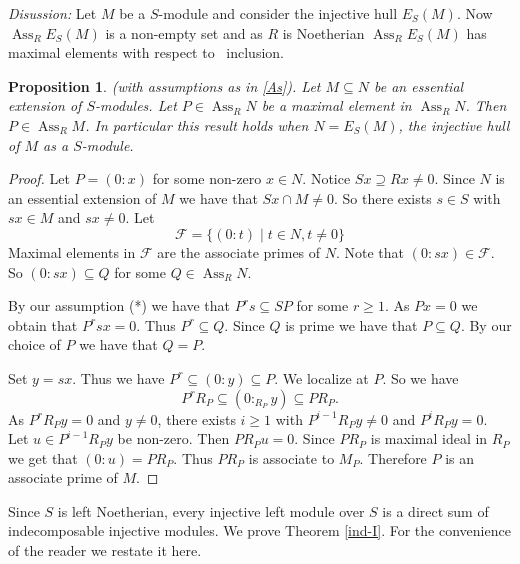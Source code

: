 \documentclass{amsart}
\theoremstyle{plain}
\newtheorem{proposition}[theorem]{Proposition}
\theoremstyle{definition}
\theoremstyle{remark}
\numberwithin{equation}{theorem}
\begin{document}
\s \emph{Disussion:} Let $M$ be a $S$-module and consider the injective hull $E_S(M)$. Now ${\operatorname{Ass}}_R E_S(M)$ is a non-empty set and as $R$ is Noetherian ${\operatorname{Ass}}_R E_S(M)$ has maximal elements {with respect to} \ inclusion.

\begin{proposition}\label{maxA}
(with assumptions as in \ref{As}). Let $M \subseteq N$ be an essential extension of $S$-modules. Let $P \in {\operatorname{Ass}}_R N$ be a maximal element in ${\operatorname{Ass}}_R N$. Then $P \in {\operatorname{Ass}}_R M$. In particular this result holds when $N = E_S(M)$, the injective hull of $M$ as a $S$-module.
\end{proposition}
\begin{proof}
Let $P = (0 \colon x)$ for some non-zero $x \in N$. Notice $Sx \supseteq Rx \neq 0$. Since $N$ is an essential extension of $M$ we have that
$Sx \cap M \neq 0$. So there exists $s \in S$ with $sx \in M$ and $sx \neq 0$. Let
\[
\mathcal{F} = \{ (0 \colon t)  \mid t \in N, t\neq 0 \}
\]
Maximal elements in $\mathcal{F}$ are  the associate primes of $N$. Note that $(0 \colon sx) \in \mathcal{F}$. So $(0\colon sx) \subseteq Q$
for some $Q \in {\operatorname{Ass}}_R N$.

By our assumption (*) we have that $P^r s \subseteq SP$ for some $r \geq 1$. As $Px = 0$ we obtain that $P^r sx = 0$. Thus $P^r \subseteq Q$. Since $Q$ is prime we have that $P \subseteq Q$. By our choice of $P$ we have that $Q = P$.

Set $y = sx$. Thus we have $P^r \subseteq (0 \colon y) \subseteq P$. We localize at $P$. So we have
\[
P^r R_P \subseteq (0 \colon_{R_P} y) \subseteq P R_P.
\]
As $P^rR_P y = 0$ and $y \neq 0$, there exists $i \geq 1$ with $P^{i-1}R_Py \neq 0$ and $P^iR_Py = 0$. Let $u \in P^{i-1}R_Py$ be non-zero. Then $PR_Pu = 0$. Since $PR_P$
is maximal ideal in $R_P$ we get that $(0 \colon u) = PR_P$. Thus $PR_P$ is associate to $M_P$. Therefore $P$ is an associate prime of $M$.
\end{proof}

Since $S$ is left Noetherian, every injective left module over $S$ is a direct sum of indecomposable injective modules.
We prove Theorem \ref{ind-I}. For the convenience of the reader we restate it here.
\end{document}
